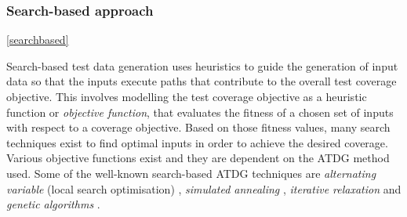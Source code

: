 
\subsubsection{Search-based approach}
\ref{searchbased}

Search-based test data generation uses heuristics to guide the generation of input data so that the inputs execute paths that contribute to the overall test coverage objective. This involves modelling the test coverage objective as a heuristic function or \emph{objective function}, that evaluates the fitness of a chosen set of inputs with respect to a coverage objective. Based on those fitness values, many search techniques exist to find optimal inputs in order to achieve the desired coverage. Various objective functions exist and they are dependent on the ATDG method used. Some of the well-known search-based ATDG techniques are \emph{alternating variable} (local search optimisation) \cite{korel1990automated, gallagher1997adtest}, \emph{simulated annealing} \cite{tracey1998automated,tracey1998way}, \emph{iterative relaxation} \cite{gupta1998automated} and \emph{genetic algorithms} \cite{michael1998automated,michael2001generating}.
 
